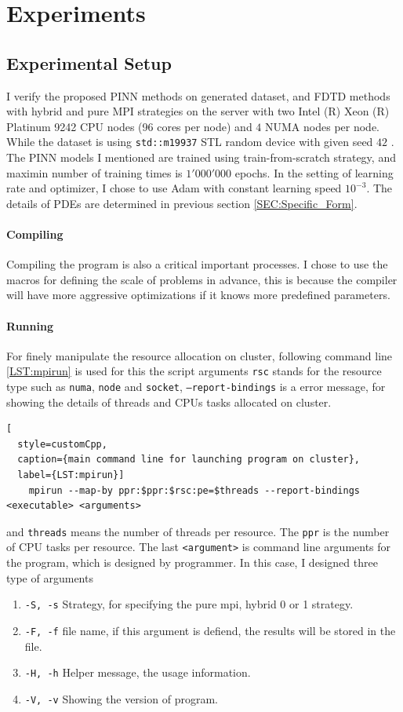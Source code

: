 \section{Experiments}
\subsection{Experimental Setup}


I verify the proposed PINN methods on generated dataset, and FDTD methods with hybrid and pure MPI strategies
on the server with two Intel (R) Xeon (R) Platinum 9242 CPU nodes (96 cores per node) and $4$ NUMA nodes per node.
While the dataset is using \texttt{std::m19937} STL random device with given seed $42$ \cite{STL:RANDOM_SEED}.
The PINN models I mentioned are trained using train-from-scratch strategy, and maximin number of training times is $1'000'000$ epochs.
In the setting of learning rate and optimizer, I chose to use Adam with constant learning speed $10^{-3}$.
The details of PDEs are determined in previous section \ref{SEC:Specific_Form}.  

\paragraph{Compiling}
Compiling the program is also a critical important processes.
I chose to use the macros for defining the scale of problems in advance, this is because the compiler will 
have more aggressive optimizations if it knows more predefined parameters.

\paragraph{Running}
For finely manipulate the resource allocation on cluster, following command line \ref{LST:mpirun} is used for this 
the script arguments \texttt{rsc} stands for the resource type such as \texttt{numa}, \texttt{node} and \texttt{socket},
\texttt{--report-bindings} is a error message, for showing the details of threads and CPUs tasks allocated on cluster.
\begin{lstlisting}[
  style=customCpp,
  caption={main command line for launching program on cluster},
  label={LST:mpirun}]
    mpirun --map-by ppr:$ppr:$rsc:pe=$threads --report-bindings <executable> <arguments>
\end{lstlisting}
and \texttt{threads} means the number of threads per resource. The \texttt{ppr} is the number of CPU tasks per resource.
The last \texttt{<argument>} is command line arguments for the program, which is designed by programmer. 
In this case, I designed three type of arguments
\begin{enumerate}
  \item \texttt{-S, -s} Strategy, for specifying the pure mpi, hybrid 0 or 1 strategy.
  \item \texttt{-F, -f} file name, if this argument is defiend, the results will be stored in the file.
  \item \texttt{-H, -h} Helper message, the usage information.
  \item \texttt{-V, -v} Showing the version of program.
\end{enumerate}



